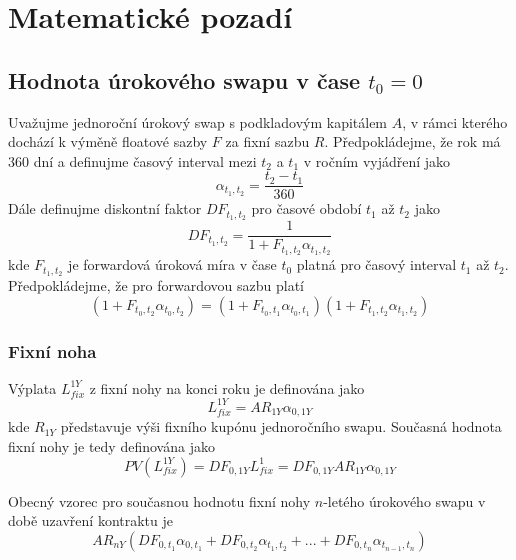 \documentclass[a4paper]{book}
\begin{document}
\section{Matematické pozadí}

\subsection{Hodnota úrokového swapu v čase $t_0 = 0$}

Uvažujme jednoroční úrokový swap s podkladovým kapitálem $A$, v rámci kterého dochází k výměně floatové sazby $F$ za fixní sazbu $R$. Předpokládejme, že rok má 360 dní a definujme časový interval mezi $t_2$ a $t_1$ v ročním vyjádření jako 
\begin{equation*}
\alpha_{t_1, t_2} = \frac{t_2 - t_1}{360}
\end{equation*}
Dále definujme diskontní faktor $DF_{t_1, t_2}$ pro časové období $t_1$ až $t_2$ jako
\begin{equation*}
DF_{t_1, t_2} = \frac{1}{1 + F_{t_1, t_2} \alpha_{t_1, t_2}}
\end{equation*}
kde $F_{t_1, t_2}$ je forwardová úroková míra v čase $t_0$ platná pro časový interval $t_1$ až $t_2$. Předpokládejme, že pro forwardovou sazbu platí
\begin{equation*}
(1 + F_{t_0, t_2} \alpha_{t_0, t_2})  = (1 + F_{t_0, t_1} \alpha_{t_0, t_1})(1 + F_{t_1, t_2} \alpha_{t_1, t_2})
\end{equation*}

\subsubsection{Fixní noha}

Výplata $L_{fix}^{1Y}$ z fixní nohy na konci roku je definována jako
\begin{equation*}
L_{fix}^{1Y} = A R_{1Y} \alpha_{0,1Y}
\end{equation*}
kde $R_{1Y}$ představuje výši fixního kupónu jednoročního swapu. Současná hodnota fixní nohy je tedy definována jako
\begin{equation*}
PV(L_{fix}^{1Y}) = DF_{0, 1Y} L_{fix}^1 =  DF_{0, 1Y} A R_{1Y} \alpha_{0,1Y}
\end{equation*}

Obecný vzorec pro současnou hodnotu fixní nohy $n$-letého úrokového swapu v době uzavření kontraktu je
\begin{equation}
AR_{nY}(DF_{0,t_1} \alpha_{0,t_1} + DF_{0, t_2} \alpha_{t_1,t_2} + ... + DF_{0, t_n} \alpha_{t_{n-1},t_n})
\end{equation}
\end{document}
